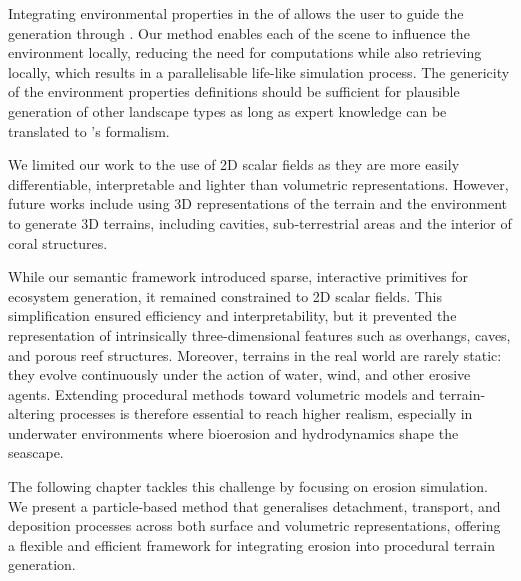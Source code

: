 Integrating environmental properties in the  of  allows the user to guide the generation through . Our method enables each  of the scene to influence the environment locally, reducing the need for computations while also retrieving  locally, which results in a parallelisable life-like simulation process. The genericity of the environment properties definitions should be sufficient for plausible generation of other landscape types as long as expert knowledge can be translated to 's formalism.

We limited our work to the use of 2D scalar fields as they are more easily differentiable, interpretable and lighter than volumetric representations. However, future works include using 3D representations of the terrain and the environment to generate 3D terrains, including cavities, sub-terrestrial areas and the interior of coral structures.

While our semantic  framework introduced sparse, interactive primitives for ecosystem generation, it remained constrained to 2D scalar fields. This simplification ensured efficiency and interpretability, but it prevented the representation of intrinsically three-dimensional features such as overhangs, caves, and porous reef structures. Moreover, terrains in the real world are rarely static: they evolve continuously under the action of water, wind, and other erosive agents. Extending procedural methods toward volumetric models and terrain-altering processes is therefore essential to reach higher realism, especially in underwater environments where bioerosion and hydrodynamics shape the seascape.

The following chapter tackles this challenge by focusing on erosion simulation. We present a particle-based method that generalises detachment, transport, and deposition processes across both surface and volumetric representations, offering a flexible and efficient framework for integrating erosion into procedural terrain generation.

